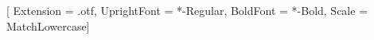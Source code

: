 \usepackage{../../../macros}
\usepackage{../../../transducer-macros}

\newcommand{\map}{\mathsf{map}}
\usepackage{xr-hyper}


\setmonofont{Inconsolatazi4}[
  Extension = .otf,
  UprightFont = *-Regular,
  BoldFont = *-Bold,
  Scale = MatchLowercase]

